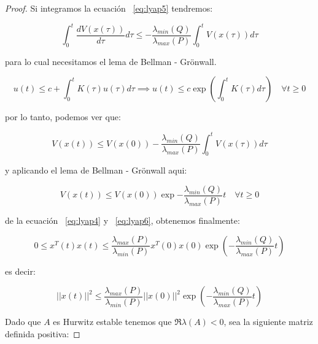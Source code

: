 \begin{proof}
        Si integramos la ecuación ~\ref{eq:lyap5} tendremos:

        \begin{equation*}
            \int_{0}^{t}\frac{dV(x(\tau))}{d\tau} d\tau \le - \frac{\lambda_{min}(Q)}{\lambda_{max}(P)} \int_{0}^{t} V(x(\tau)) d\tau
        \end{equation*}

        para lo cual necesitamos el lema de Bellman - Grönwall.

        \begin{nota}
            \begin{equation*}
                u(t) \le c + \int_0^t K(\tau) u(\tau) d\tau \implies u(t) \le c \exp{\left( \int_0^t K(\tau) d\tau \right)} \quad \forall t \ge 0
            \end{equation*}
        \end{nota}

        por lo tanto, podemos ver que:

        \begin{equation}
            V(x(t)) \le V(x(0)) - \frac{\lambda_{min}(Q)}{\lambda_{max}(P)} \int_0^t V(x(\tau)) d\tau
        \end{equation}

        y aplicando el lema de Bellman - Grönwall aqui:

        \begin{equation} \label{eq:lyap6}
            V(x(t)) \le V(x(0)) \exp{- \frac{\lambda_{min}(Q)}{\lambda_{max}(P)} t} \quad \forall t \ge 0
        \end{equation}

        de la ecuación ~\ref{eq:lyap4} y ~\ref{eq:lyap6}, obtenemos finalmente:

        \begin{equation*}
            0 \le x^T(t)x(t) \le \frac{\lambda_{max}(P)}{\lambda_{min}(P)} x^T(0)x(0) \exp{\left( - \frac{\lambda_{min}(Q)}{\lambda_{max}(P)} t \right)}
        \end{equation*}

        es decir:

        \begin{equation*}
            ||x(t)||^2 \le \frac{\lambda_{max}(P)}{\lambda_{min}(P)} ||x(0)||^2 \exp{\left( - \frac{\lambda_{min}(Q)}{\lambda_{max}(P)} t \right)}
        \end{equation*}

        Dado que $A$ es Hurwitz estable tenemos que $\Re{\lambda(A)} < 0$, sea la siguiente matriz definida positiva:


\end{proof}
